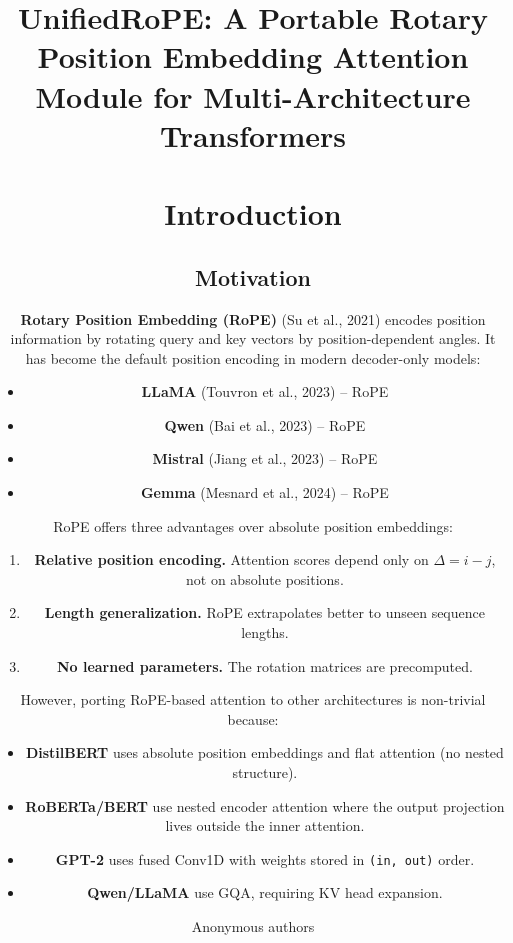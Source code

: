 \title{\textbf{UnifiedRoPE: A Portable Rotary Position Embedding Attention Module for Multi-Architecture Transformers}

\author{Anonymous authors}



\section{Introduction}

\subsection{Motivation}

\textbf{Rotary Position Embedding (RoPE)} (Su et al., 2021) encodes position 
information by rotating query and key vectors by position-dependent angles. 
It has become the default position encoding in modern decoder-only models:

\begin{itemize}
\item \textbf{LLaMA} (Touvron et al., 2023) -- RoPE
\item \textbf{Qwen} (Bai et al., 2023) -- RoPE
\item \textbf{Mistral} (Jiang et al., 2023) -- RoPE
\item \textbf{Gemma} (Mesnard et al., 2024) -- RoPE

\end{itemize}
RoPE offers three advantages over absolute position embeddings:

\begin{enumerate}
\item \textbf{Relative position encoding.} Attention scores depend only on
  $\Delta = i - j$, not on absolute positions.
\item \textbf{Length generalization.} RoPE extrapolates better to unseen sequence
  lengths.
\item \textbf{No learned parameters.} The rotation matrices are precomputed.

\end{enumerate}
However, porting RoPE-based attention to other architectures is 
non-trivial because:

\begin{itemize}
\item \textbf{DistilBERT} uses absolute position embeddings and flat attention
  (no nested structure).
\item \textbf{RoBERTa/BERT} use nested encoder attention where the output
  projection lives outside the inner attention.
\item \textbf{GPT-2} uses fused Conv1D with weights stored in \texttt{(in, out)} order.
\item \textbf{Qwen/LLaMA} use GQA, requiring KV head expansion.


\end{itemize}}
